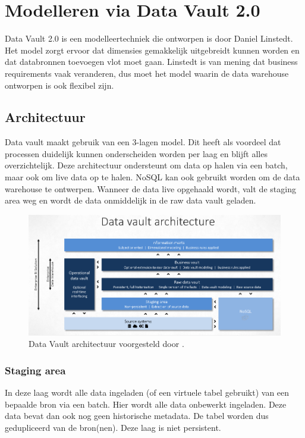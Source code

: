\section{Modelleren via Data Vault 2.0}
Data Vault 2.0 is een modelleertechniek die ontworpen is door Daniel Linstedt. Het model zorgt ervoor dat dimensies gemakkelijk uitgebreidt kunnen worden en dat databronnen toevoegen vlot moet gaan. Linstedt is van mening dat business requirements vaak veranderen, dus moet het model waarin de data warehouse ontworpen is ook flexibel zijn. 
~\autocite{Linstedt2016}
\subsection{Architectuur}
Data vault maakt gebruik van een 3-lagen model. Dit heeft als voordeel dat processen duidelijk kunnen onderscheiden worden per laag en blijft alles overzichtelijk. Deze architectuur ondersteunt om data op halen via een batch, maar ook om live data op te halen. NoSQL kan ook gebruikt worden om de data warehouse te ontwerpen. Wanneer de data live opgehaald wordt, valt de staging area weg en wordt de data onmiddelijk in de raw data vault geladen.  ~\autocite{Linstedt2016}


\begin{figure}[h]
	\includegraphics[scale=0.63]{../images/DVArchitectuur.png}
	\caption{Data Vault architectuur voorgesteld door \textcite{Stroobants2018}.}
	\label{fig:dvarch}
\end{figure}

\subsubsection{Staging area}
In deze laag wordt alle data ingeladen (of een virtuele tabel gebruikt) van een bepaalde bron via een batch. Hier wordt alle data onbewerkt ingeladen. Deze data bevat dan ook nog geen historische metadata. De tabel worden dus gedupliceerd van de bron(nen). Deze laag is niet persistent.

